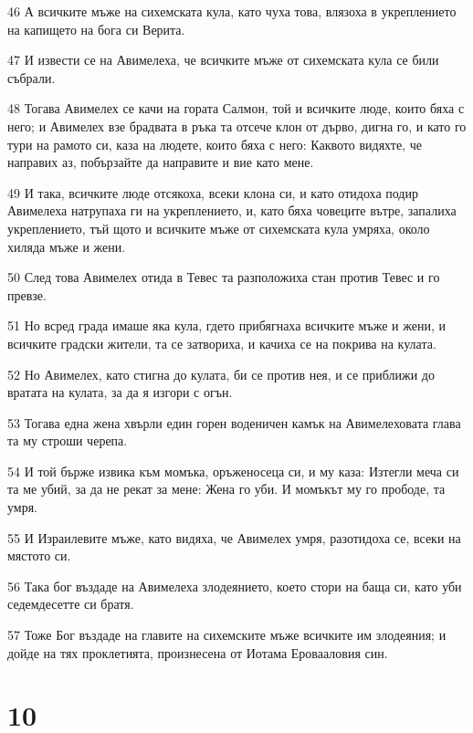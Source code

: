 \par 46 А всичките мъже на сихемската кула, като чуха това, влязоха в укреплението на капището на бога си Верита.
\par 47 И извести се на Авимелеха, че всичките мъже от сихемската кула се били събрали.
\par 48 Тогава Авимелех се качи на гората Салмон, той и всичките люде, които бяха с него; и Авимелех взе брадвата в ръка та отсече клон от дърво, дигна го, и като го тури на рамото си, каза на людете, които бяха с него: Каквото видяхте, че направих аз, побързайте да направите и вие като мене.
\par 49 И така, всичките люде отсякоха, всеки клона си, и като отидоха подир Авимелеха натрупаха ги на укреплението, и, като бяха човеците вътре, запалиха укреплението, тъй щото и всичките мъже от сихемската кула умряха, около хиляда мъже и жени.
\par 50 След това Авимелех отида в Тевес та разположиха стан против Тевес и го превзе.
\par 51 Но всред града имаше яка кула, гдето прибягнаха всичките мъже и жени, и всичките градски жители, та се затвориха, и качиха се на покрива на кулата.
\par 52 Но Авимелех, като стигна до кулата, би се против нея, и се приближи до вратата на кулата, за да я изгори с огън.
\par 53 Тогава една жена хвърли един горен воденичен камък на Авимелеховата глава та му строши черепа.
\par 54 И той бърже извика към момъка, оръженосеца си, и му каза: Изтегли меча си та ме убий, за да не рекат за мене: Жена го уби. И момъкът му го прободе, та умря.
\par 55 И Израилевите мъже, като видяха, че Авимелех умря, разотидоха се, всеки на мястото си.
\par 56 Така бог въздаде на Авимелеха злодеянието, което стори на баща си, като уби седемдесетте си братя.
\par 57 Тоже Бог въздаде на главите на сихемските мъже всичките им злодеяния; и дойде на тях проклетията, произнесена от Иотама Еровааловия син.

\chapter{10}

